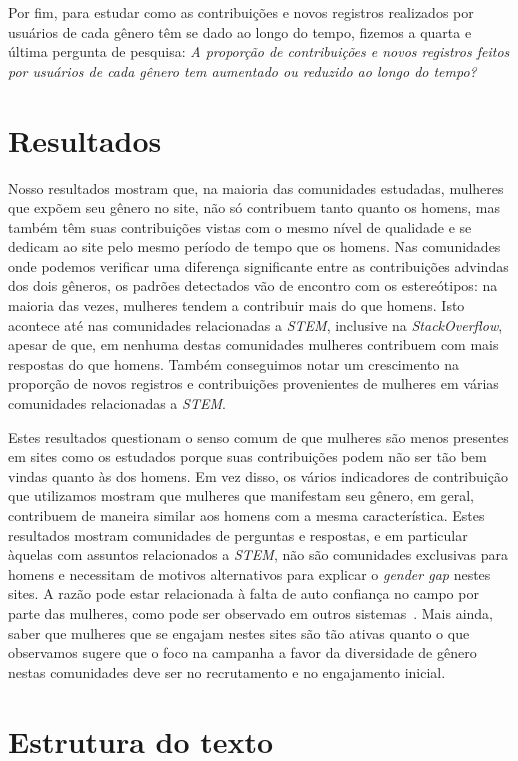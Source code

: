 Por fim, para estudar como as contribuições e novos registros realizados por usuários de cada gênero têm se dado ao longo do tempo, fizemos a quarta e última pergunta de pesquisa: \textit{A proporção de contribuições e novos registros feitos por usuários de cada gênero tem aumentado ou reduzido ao longo do tempo?}


\section{Resultados}

Nosso resultados mostram que, na maioria das comunidades estudadas, mulheres que expõem seu gênero no site, não só contribuem tanto quanto os homens, mas também têm suas contribuições vistas com o mesmo nível de qualidade e se dedicam ao site pelo mesmo período de tempo que os homens. Nas comunidades onde podemos verificar uma diferença significante entre as contribuições advindas dos dois gêneros, os padrões detectados vão de encontro com os estereótipos: na maioria das vezes, mulheres tendem a contribuir mais do que homens. Isto acontece até nas comunidades relacionadas a \emph{STEM}, inclusive na \emph{StackOverflow}, apesar de que, em nenhuma destas comunidades mulheres contribuem com mais respostas do que homens. Também conseguimos notar um crescimento na proporção de novos registros e contribuições provenientes de mulheres em várias comunidades relacionadas a \emph{STEM}.

Estes resultados questionam o senso comum de que mulheres são menos presentes em sites como os estudados porque suas contribuições podem não ser tão bem vindas quanto às dos homens. Em vez disso, os vários indicadores de contribuição que utilizamos mostram que mulheres que manifestam seu gênero, em geral, contribuem de maneira similar aos homens com a mesma característica. Estes resultados mostram comunidades de perguntas e respostas, e em particular àquelas com assuntos relacionados a \emph{STEM}, não são comunidades exclusivas para homens e necessitam de motivos alternativos para explicar o \textit{gender gap} nestes sites. A razão pode estar relacionada à falta de auto confiança no campo por parte das mulheres, como pode ser observado em outros sistemas~\cite{piazza:report}. Mais ainda, saber que mulheres que se engajam nestes sites são tão ativas quanto o que observamos sugere que o foco na campanha a favor da diversidade de gênero nestas comunidades deve ser no recrutamento e no engajamento inicial.

\section{Estrutura do texto}

